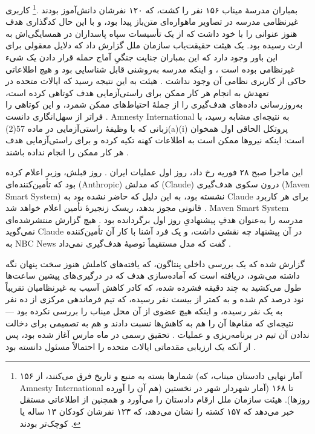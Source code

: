 بمباران مدرسهٔ میناب ۱۵۶ نفر را کشت، که ۱۲۰ نفرشان دانش‌آموز بودند \autocite[بند~۹۲]{UNFFMIran2026}.\footnote{شمارها بسته به منبع و تاریخ فرق می‌کنند، از ۱۵۶ (آمار نهایی دادستان میناب، که Amnesty International هم آن را آورده) تا ۱۶۸ (آمار شهردار شهر در نخستین روزها). هیئت سازمان ملل ارقام دادستان را می‌آورد و همچنین از اطلاعاتی مستقل خبر می‌دهد که ۱۵۷ کشته را نشان می‌دهد، که ۱۲۳ نفرشان کودکان ۱۳ ساله یا کوچک‌تر بودند \autocite[بندهای~۹۲–۹۳]{UNFFMIran2026}.} کاربری غیرنظامی مدرسه در تصاویر ماهواره‌ای متن‌باز پیدا بود، و با این حال کدگذاری هدف هنوز عنوانی را با خود داشت که از یک تأسیسات سپاه پاسداران در همسایگی‌اش به ارث رسیده بود. یک هیئت حقیقت‌یاب سازمان ملل گزارش داد که دلایل معقولی برای این باور وجود دارد که این بمباران جنایت جنگیِ آماج حمله قرار دادن یک شیء غیرنظامی بوده است \autocite{ohchr2026minabpress}، و اینکه مدرسه به‌روشنی قابل شناسایی بود و هیچ اطلاعاتی حاکی از کاربری نظامی آن وجود نداشت \autocite[بندهای~۸۱–۸۶، ۱۲۴–۱۲۶]{UNFFMIran2026}. هیئت به این نتیجه رسید که ایالات متحده در تعهدش به انجام هر کار ممکن برای راستی‌آزمایی هدف کوتاهی کرده است، به‌روزرسانی داده‌های هدف‌گیری را از جملهٔ احتیاط‌های ممکن شمرد، و این کوتاهی را فراتر از سهل‌انگاری دانست \autocite[بندهای~۱۲۴–۱۲۵]{UNFFMIran2026}. Amnesty International به نتیجه‌ای مشابه رسید، با زبانی که با وظیفهٔ راستی‌آزمایی در ماده \foreignlanguage{english}{57(2)(a)(i)} پروتکل الحاقی اول همخوان است: اینکه نیروها ممکن است به اطلاعات کهنه تکیه کرده و برای راستی‌آزمایی هدف هر کار ممکن را انجام نداده باشند \autocite{Amnesty2026Minab}.

این ماجرا صبح ۲۸ فوریه رخ داد، روز اول عملیات ایران \autocite{Amnesty2026Minab,crs2026iranwar}. روز قبلش، وزیر اعلام کرده بود که تأمین‌کننده‌ای (Anthropic) که مدلش (Claude) درون سکوی هدف‌گیری (Maven Smart System) نشسته بود، به این دلیل که حاضر نشده بود به Claude برای هر کاربرد قانونی مجوز بدهد، ریسک زنجیرهٔ تأمین اعلام خواهد شد \autocite{npr2026openai}. Maven Smart System مدرسه را به‌عنوان هدفِ پیشنهادیِ روز اول برگردانده بود \autocite{livingstone2026maven,gizmodo2026minab}. هیچ گزارش منتشرشده‌ای نمی‌گوید Claude در آن پیشنهاد چه نقشی داشت، و یک فرد آشنا با کار آن تأمین‌کننده به NBC News گفت که مدل مستقیماً توصیهٔ هدف‌گیری نمی‌داد \autocite{nbc2026targeting}.

گزارش شده که یک بررسی داخلی پنتاگون، که یافته‌های کاملش هنوز سخت پنهان نگه داشته می‌شود، دریافته است که آماده‌سازی هدف که در درگیری‌های پیشین ساعت‌ها طول می‌کشید به چند دقیقه فشرده شده، که کادر کاهش آسیب به غیرنظامیان تقریباً نود درصد کم شده و به کمتر از بیست نفر رسیده، که تیم فرماندهی مرکزی از ده نفر به یک نفر رسیده، و اینکه هیچ عضوی از آن محل میناب را بررسی نکرده بود — نتیجه‌ای که مقام‌ها آن را هم به کاهش‌ها نسبت دادند و هم به تصمیمی برای دخالت ندادن آن تیم در برنامه‌ریزی و عملیات \autocite{Bloomberg2026KillChain}. تحقیق رسمی در ماه مارس آغاز شده بود، پس از آنکه یک ارزیابی مقدماتی ایالات متحده را احتمالاً مسئول دانسته بود \autocite{NPR2026MinabProbe}.

